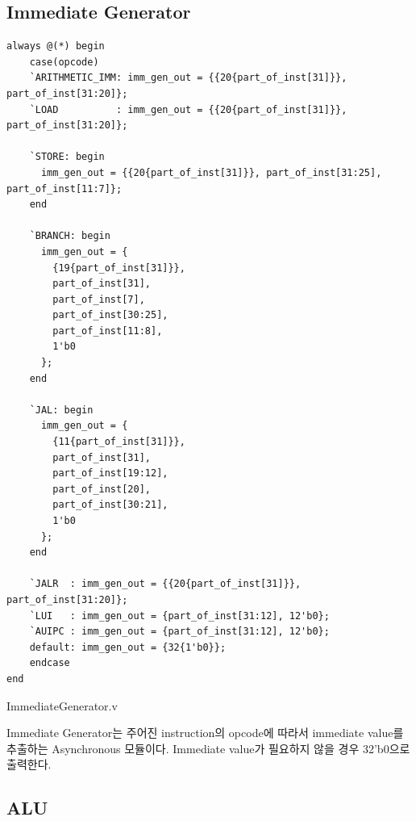 \documentclass[openright, a4paper]{article}
\newenvironment{longlisting}{\captionsetup{type=listing}}{}
\begin{document}
\subsection{Immediate Generator}

\begin{longlisting}
    \begin{verbatim}
always @(*) begin
    case(opcode)
    `ARITHMETIC_IMM: imm_gen_out = {{20{part_of_inst[31]}}, part_of_inst[31:20]};
    `LOAD          : imm_gen_out = {{20{part_of_inst[31]}}, part_of_inst[31:20]};

    `STORE: begin
      imm_gen_out = {{20{part_of_inst[31]}}, part_of_inst[31:25], part_of_inst[11:7]};
    end

    `BRANCH: begin
      imm_gen_out = {
        {19{part_of_inst[31]}},
        part_of_inst[31],
        part_of_inst[7],
        part_of_inst[30:25],
        part_of_inst[11:8],
        1'b0
      };
    end

    `JAL: begin
      imm_gen_out = {
        {11{part_of_inst[31]}},
        part_of_inst[31],
        part_of_inst[19:12],
        part_of_inst[20],
        part_of_inst[30:21],
        1'b0
      };
    end

    `JALR  : imm_gen_out = {{20{part_of_inst[31]}}, part_of_inst[31:20]};
    `LUI   : imm_gen_out = {part_of_inst[31:12], 12'b0};
    `AUIPC : imm_gen_out = {part_of_inst[31:12], 12'b0};
    default: imm_gen_out = {32{1'b0}};
    endcase
end
    \end{verbatim}
    \caption{ImmediateGenerator.v}
\end{longlisting}

Immediate Generator는 주어진 instruction의 opcode에 따라서 immediate value를 추출하는 Asynchronous 모듈이다. Immediate value가 필요하지 않을 경우 32'b0으로 출력한다. \\

\subsection{ALU}
\end{document}
